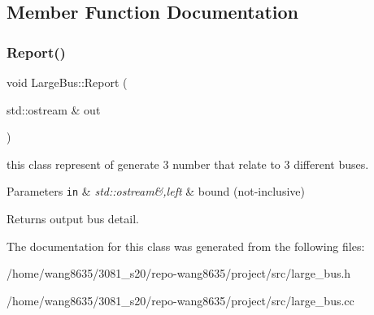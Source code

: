 \subsection{Member Function Documentation}
\mbox{\label{classLargeBus_a401d909a31f2adf60b2f92681a2541d0}} 
\subsubsection{\texorpdfstring{Report()}{Report()}}
{\footnotesize\ttfamily void Large\+Bus\+::\+Report (\begin{DoxyParamCaption}\item[{std\+::ostream \&}]{out }\end{DoxyParamCaption})}



this class represent of generate 3 number that relate to 3 different buses. 


\begin{DoxyParams}[1]{Parameters}
\mbox{\tt in}  & {\em std\+::ostream\&,left} & bound (not-\/inclusive)\\
\hline
\end{DoxyParams}
\begin{DoxyReturn}{Returns}
output bus detail. 
\end{DoxyReturn}


The documentation for this class was generated from the following files\+:\begin{DoxyCompactItemize}
\item 
/home/wang8635/3081\+\_\+s20/repo-\/wang8635/project/src/large\+\_\+bus.\+h\item 
/home/wang8635/3081\+\_\+s20/repo-\/wang8635/project/src/large\+\_\+bus.\+cc\end{DoxyCompactItemize}
